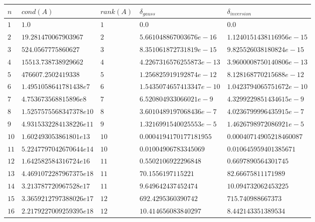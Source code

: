 \documentclass[12pt]{article}
\begin{document}
        \newpage

        \begin{table}[h!]
            \begin{tabularx}{\textwidth}{l l l l l }
                \hline
                $n$ & $cond(A)$ & $rank(A)$ & $\delta_{gauss}$ & $\delta_{inversion}$ \\
                \hline
                $1$ & $1.0$ & $1$ & $0.0$ & $0.0$ \\
                $2$ & $19.281470067903967$ & $2$ & $5.661048867003676e-16$ & $1.1240151438116956e-15$ \\
                $3$ & $524.0567775860627$ & $3$ & $8.351061872731819e-15$ & $9.825526038180824e-15$ \\
                $4$ & $15513.738738929662$ & $4$ & $4.2267316576255873e-13$ & $3.9600008750140806e-13$ \\
                $5$ & $476607.2502419338$ & $5$ & $1.256825919192874e-12$ & $8.128168770215688e-12$ \\
                $6$ & $1.4951058641781438e7$ & $6$ & $1.5435074657413347e-10$ & $1.0423794065751672e-10$ \\
                $7$ & $4.753673568815896e8$ & $7$ & $6.520804933066021e-9$ & $4.3299229851434615e-9$ \\
                $8$ & $1.5257575568347378e10$ & $8$ & $3.6010489197068436e-7$ & $4.0236799996435915e-7$ \\
                $9$ & $4.9315332284138226e11$ & $9$ & $1.3216991540025553e-5$ & $1.4626798972086921e-5$ \\
                $10$ & $1.602493053861801e13$ & $10$ & $0.0004194170177181955$ & $0.00040714905218460087$ \\
                $11$ & $5.2247797042670644e14$ & $10$ & $0.01004906783345069$ & $0.010645959401385671$ \\
                $12$ & $1.642582584316724e16$ & $11$ & $0.5502106922296848$ & $0.6697890564301745$ \\
                $13$ & $4.4691072287967375e18$ & $11$ & $70.1556197115221$ & $82.66675811171989$ \\
                $14$ & $3.213787720967528e17$ & $11$ & $9.649642437452474$ & $10.094732062453225$ \\
                $15$ & $3.3659212797388026e17$ & $12$ & $692.4295360390742$ & $715.740988667373$ \\
                $16$ & $2.2179227009259395e18$ & $12$ & $10.414656083840297$ & $8.442143351389534$ \\

\end{tabularx}
\end{table}
\end{document}
